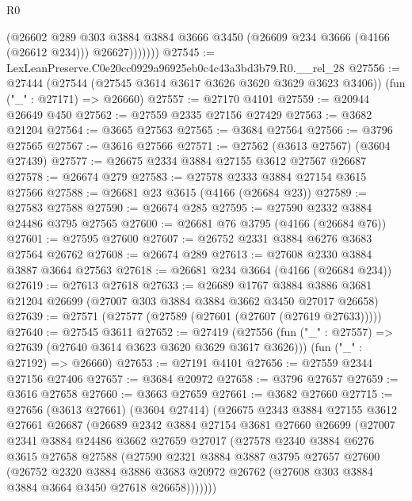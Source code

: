 \begin{lexlean}{R0}
\begin{coremodule}
                (@26602
                  @289
                  @303
                  @3884
                  @3884
                  @3666
                  @3450
                  (@26609 @234 @3666 (@4166 (@26612 @234)))
                  @26627)))))))
@27545 := LexLeanPreserve.C0e20cc0929a96925eb0c4c43a3bd3b79.R0.__rel_28
@27556 := @27444
    (@27544 (@27545 @3614 @3617 @3626 @3620 @3629 @3623 @3406))
    (fun ("_" : @27171) => @26660)
@27557 := @27170 @4101
@27559 := @20944 @26649 @450
@27562 := @27559 @2335 @27156 @27429
@27563 := @3682 @21204
@27564 := @3665 @27563
@27565 := @3684 @27564
@27566 := @3796 @27565
@27567 := @3616 @27566
@27571 := @27562 (@3613 @27567) (@3604 @27439)
@27577 := @26675 @2334 @3884 @27155 @3612 @27567 @26687
@27578 := @26674 @279
@27583 := @27578 @2333 @3884 @27154 @3615 @27566
@27588 := @26681 @23 @3615 (@4166 (@26684 @23))
@27589 := @27583 @27588
@27590 := @26674 @285
@27595 := @27590 @2332 @3884 @24486 @3795 @27565
@27600 := @26681 @76 @3795 (@4166 (@26684 @76))
@27601 := @27595 @27600
@27607 := @26752 @2331 @3884 @6276 @3683 @27564 @26762
@27608 := @26674 @289
@27613 := @27608 @2330 @3884 @3887 @3664 @27563
@27618 := @26681 @234 @3664 (@4166 (@26684 @234))
@27619 := @27613 @27618
@27633 := @26689
    @1767
    @3884
    @3886
    @3681
    @21204
    @26699
    (@27007 @303 @3884 @3884 @3662 @3450 @27017 @26658)
@27639 := @27571 (@27577 (@27589 (@27601 (@27607 (@27619 @27633)))))
@27640 := @27545 @3611
@27652 := @27419
    (@27556 (fun ("_" : @27557) => @27639 (@27640 @3614 @3623 @3620 @3629 @3617 @3626)))
    (fun ("_" : @27192) => @26660)
@27653 := @27191 @4101
@27656 := @27559 @2344 @27156 @27406
@27657 := @3684 @20972
@27658 := @3796 @27657
@27659 := @3616 @27658
@27660 := @3663 @27659
@27661 := @3682 @27660
@27715 := @27656
    (@3613 @27661)
    (@3604 @27414)
    (@26675
      @2343
      @3884
      @27155
      @3612
      @27661
      @26687
      (@26689
        @2342
        @3884
        @27154
        @3681
        @27660
        @26699
        (@27007
          @2341
          @3884
          @24486
          @3662
          @27659
          @27017
          (@27578
            @2340
            @3884
            @6276
            @3615
            @27658
            @27588
            (@27590
              @2321
              @3884
              @3887
              @3795
              @27657
              @27600
              (@26752
                @2320
                @3884
                @3886
                @3683
                @20972
                @26762
                (@27608 @303 @3884 @3884 @3664 @3450 @27618 @26658)))))))

\end{coremodule}
\end{lexlean}
